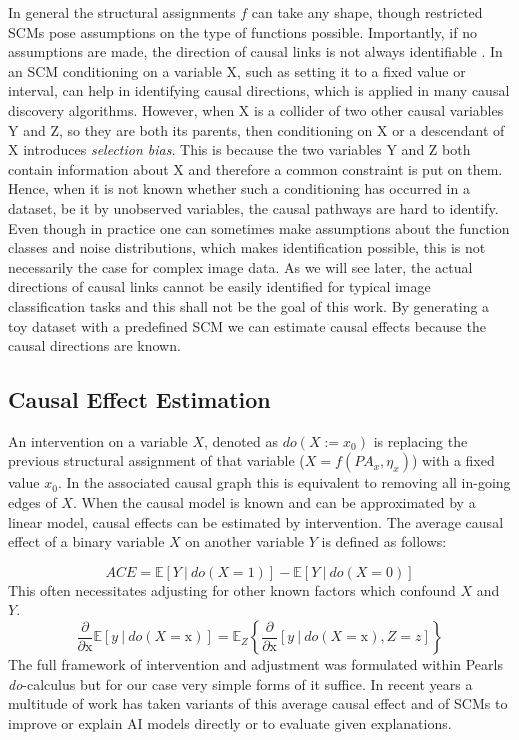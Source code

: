 In general the structural assignments $f$ can take any shape, though restricted SCMs pose assumptions on the type of functions possible. Importantly, if no assumptions are made, the direction of causal links is not always identifiable \cite{Peters2017}. In an SCM conditioning on a variable X, such as setting it to a fixed value or interval, can help in identifying causal directions, which is applied in many causal discovery algorithms. However, when X is a collider of two other causal variables Y and Z, so they are both its parents, then conditioning on X or a descendant of X introduces \textit{selection bias}. This is because the two variables Y and Z both contain information about X and therefore a common constraint is put on them. Hence, when it is not known whether such a conditioning has occurred in a dataset, be it by unobserved variables, the causal pathways are hard to identify. 
Even though in practice one can sometimes make assumptions about the function classes and noise distributions, which makes identification possible, this is not necessarily the case for complex image data. As we will see later, the actual directions of causal links cannot be easily identified for typical image classification tasks and this shall not be the goal of this work. By generating a toy dataset with a predefined SCM we can estimate causal effects because the causal directions are known.


\subsection{Causal Effect Estimation}
An intervention on a variable $X$, denoted as $do(X := x_0)$ is replacing the previous structural assignment of that variable ($X = f(PA_x, \eta_x)$) with a fixed value $x_0$. 
In the associated causal graph this is equivalent to removing all in-going edges of $X$.
When the causal model is known and can be approximated by a linear model, causal effects can be estimated by intervention. The average causal effect of a binary variable $X$ on another variable $Y$ is defined as follows:

\begin{equation}
\displaystyle ACE = \mathbb{E} [ Y \ | \ do(X=1) ] - \mathbb{E} [ Y \ | \ do(X=0) ] 
\end{equation}
This often necessitates adjusting for other known factors which confound $X$ and $Y$.
\begin{equation}
\frac{\partial}{\partial \mathrm{x}} \mathbb{E} [ y \ | \ do(X=\mathrm{x}) ] = 
\mathbb{E}_Z \left\{ \frac{\partial}{\partial \mathrm{x}} [ y \ | \ do(X=\mathrm{x}), Z=z ] \right\}
\end{equation}
The full framework of intervention and adjustment was formulated within Pearls \textit{do}-calculus \cite{Pearl2009} but for our case very simple forms of it suffice.
In recent years a multitude of work has taken variants of this average causal effect and of SCMs to improve or explain AI models directly or to evaluate given explanations. 

